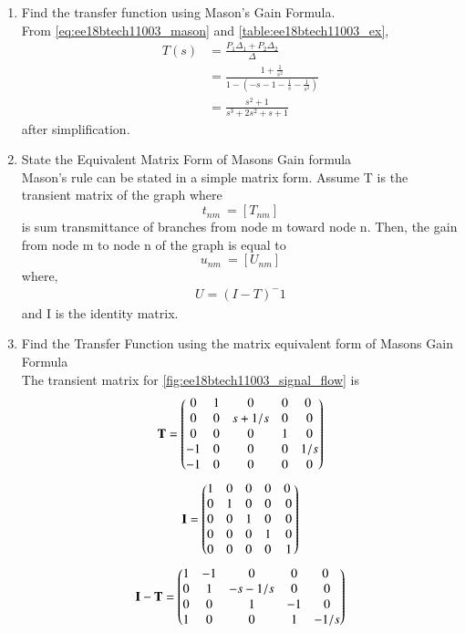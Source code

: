\begin{enumerate}[label=\thesection.\arabic*.,ref=\thesection.\theenumi]
\item  Find the transfer function using Mason's Gain Formula.
\renewcommand{\thefigure}{\theenumi.\arabic{figure}}
%
\\
\solution From \eqref{eq:ee18btech11003_mason} and \ref{table:ee18btech11003_ex},
\begin{align}
T(s)&=\frac{P_1 \Delta_1+P_2 \Delta_2}{\Delta}
\\
&=\frac{1 +\frac{1}{s^2}}{1-(-s-1-\frac{1}{s}-\frac{1}{s^2})}
\\
&=\frac{s^2+1}{s^3+2s^2+s+1}
\end{align}
%
after simplification.
\renewcommand{\thefigure}{\theenumi}
\item State the Equivalent Matrix Form of  Masons Gain formula 
\\
\solution Mason's rule can be stated in a simple matrix form. Assume T is  the transient matrix of the graph where \[t_{nm}\ =[T_{nm}]\] is sum transmittance of branches from node m toward node n. Then, the gain from node m to node n of the graph is equal to \[u_{nm}\ =[U_{nm}]\] where,
\begin{align}
    U=(I-T)^-1
\end{align}
and I is the identity matrix.
\item Find the Transfer Function using the matrix equivalent form of Masons Gain Formula
\\
\solution The transient matrix for \ref{fig:ee18btech11003_signal_flow}  is 
\begin{align}
\mathbf{T} = \begin{pmatrix}0 & 1 & 0 & 0 & 0 \ \\
0 & 0 & s+1/s & 0 & 0   \\
 0 & 0 & 0 & 1 & 0 \\
 -1 & 0 & 0 & 0 &1/s \\
-1 & 0 & 0 & 0 & 0 \end{pmatrix}
\end{align}
\begin{align}
\mathbf{I} = \begin{pmatrix}1 & 0 & 0 & 0 & 0 \ \\
0 & 1 & 0 & 0 & 0   \\
 0 & 0 & 1 & 0 & 0 \\
 0 & 0 & 0 & 1 & 0 \\
0 & 0 & 0 & 0 & 1 \end{pmatrix}
\end{align}
\begin{align}
\mathbf{I}-\mathbf{T} = \begin{pmatrix}1 & -1 & 0 & 0 & 0 \ \\
0 & 1 & -s-1/s & 0 & 0   \\
 0 & 0 & 1 & -1 & 0 \\
 1 & 0 & 0 & 1 &-1/s \\
\end{pmatrix}
\end{align}
\end{enumerate}
